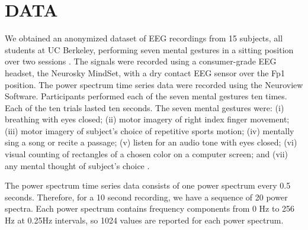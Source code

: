 \section{\uppercase{Data}}
\label{sec:data}


\noindent We obtained an anonymized dataset of EEG recordings from 15 subjects, all students at UC Berkeley, performing seven mental gestures in a sitting position over two sessions \cite{adams_i_2013}. The signals were recorded using a consumer-grade EEG headset, the Neurosky MindSet, with a dry contact EEG sensor over the Fp1 position. The power spectrum time series data were recorded using the Neuroview Software.
Participants performed each of the seven mental gestures ten times. Each of the ten trials lasted ten seconds. The seven mental gestures were: (i) breathing with eyes closed; (ii) motor imagery of right index finger movement; (iii) motor imagery of subject's choice of repetitive sports motion; (iv) mentally sing a song or recite a passage; (v) listen for an audio tone with eyes closed; (vi) visual counting of rectangles of a chosen color on a computer screen; and (vii) any mental thought of subject's choice \cite{adams_i_2013}.


The power spectrum time series data consists of one power spectrum every 0.5 seconds. Therefore, for a 10 second recording, we have a sequence of 20 power spectra. Each power spectrum contains frequency components from 0 Hz to 256 Hz at 0.25Hz intervals, so 1024 values are reported for each power spectrum.


